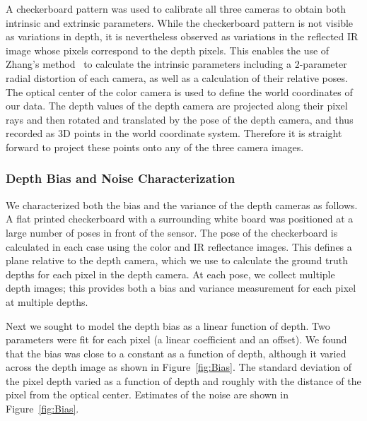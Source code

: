 A checkerboard pattern was used to calibrate all three cameras to obtain both intrinsic and extrinsic parameters.  While the checkerboard pattern is not visible as variations in depth, it is nevertheless observed as variations in the reflected IR image whose pixels correspond to the depth pixels.  This enables the use of Zhang's method~\cite{Zhang2000} to calculate the intrinsic parameters including a $2$-parameter radial distortion of each camera, as well as a calculation of their relative poses.  The optical center of the color camera is used to define the world coordinates of our data.  The depth values of the depth camera are projected along their pixel rays and then rotated and translated by the pose of the depth camera, and thus recorded as $3$D points in the world coordinate system.   
Therefore it is straight forward to project these points onto any of the three camera images.

\subsubsection{Depth Bias and Noise Characterization}
\label{sec:bias}

We characterized both the bias and the variance of the depth cameras as follows.  
A flat printed checkerboard with a surrounding white board was positioned at a large number of poses in front of the sensor.  
The pose of the checkerboard is calculated in each case using the color and IR reflectance images.  
This defines a plane relative to the depth camera, which we use to calculate the ground truth depths for each pixel in the depth camera.  
At each pose, we collect multiple depth images; this provides both a bias and variance measurement for each pixel at multiple depths.

Next we sought to model the depth bias as a linear function of depth.  
Two parameters were fit for each pixel (a linear coefficient and an offset).  
We found that the bias was close to a constant as a function of depth, although it varied across the depth image as shown in Figure~\ref{fig:Bias}.  
The standard deviation of the pixel depth varied as a function of depth and roughly with the distance of the pixel from the optical center.  
Estimates of the noise are shown in Figure~\ref{fig:Bias}.

